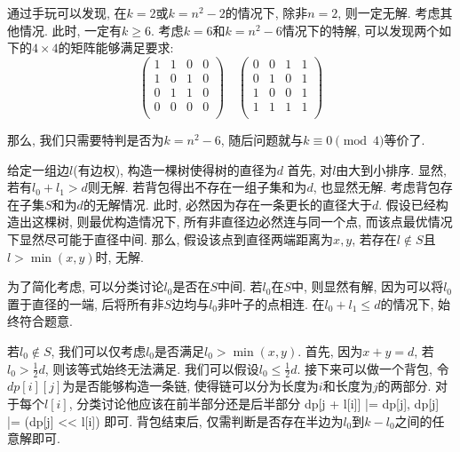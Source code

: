 通过手玩可以发现, 在$k = 2$或$k = n^2 - 2$的情况下, 除非$n=2$, 则一定无解. 考虑其他情况. 此时, 一定有$k \geq 6$. 考虑$k = 6$和$k = n^2 - 6$情况下的特解, 可以发现两个如下的$4 \times 4$的矩阵能够满足要求:
$$
\begin{pmatrix}
1 & 1 & 0 & 0 \\
1 & 0 & 1 & 0 \\
0 & 1 & 1 & 0 \\
0 & 0 & 0 & 0 \\
\end{pmatrix}
\quad
\begin{pmatrix}
0 & 0 & 1 & 1 \\
0 & 1 & 0 & 1 \\
1 & 0 & 0 & 1 \\
1 & 1 & 1 & 1 \\
\end{pmatrix}
$$

那么, 我们只需要特判是否为$k = n^2-6$, 随后问题就与$k \equiv 0 \pmod{4}$等价了.

\prob 给定一组边$l$(有边权), 构造一棵树使得树的直径为$d$
\sol 首先, 对$l$由大到小排序. 显然, 若有$l_0 + l_1 > d$则无解. 若背包得出不存在一组子集和为$d$, 也显然无解. 考虑背包存在子集$S$和为$d$的无解情况. 此时, 必然因为存在一条更长的直径大于$d$. 假设已经构造出这棵树, 则最优构造情况下, 所有非直径边必然连与同一个点, 而该点最优情况下显然尽可能于直径中间. 那么, 假设该点到直径两端距离为$x, y$, 若存在$l \not \in S$且$l > \min(x,y)$时, 无解.

为了简化考虑, 可以分类讨论$l_0$是否在$S$中间. 若$l_0$在$S$中, 则显然有解, 因为可以将$l_0$置于直径的一端, 后将所有非$S$边均与$l_0$非叶子的点相连. 在$l_0 + l_1 \leq d$的情况下, 始终符合题意.

若$l_0 \not \in S$, 我们可以仅考虑$l_0$是否满足$l_0 > \min(x,y)$. 首先, 因为$x + y = d$, 若$l_0 > \frac{1}{2} d$, 则该等式始终无法满足. 我们可以假设$l_0 \leq \frac{1}{2}d$. 接下来可以做一个背包, 令$dp[i][j]$为是否能够构造一条链, 使得链可以分为长度为$i$和长度为$j$的两部分. 对于每个$l[i]$, 分类讨论他应该在前半部分还是后半部分 dp[j + l[i]] |= dp[j], dp[j] |= (dp[j] << l[i]) 即可. 背包结束后, 仅需判断是否存在半边为$l_0$到$k - l_0$之间的任意解即可.